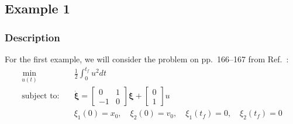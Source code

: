 \subsection{Example 1} \label{sec:ch5:example1}

\subsubsection{Description}

For the first example, we will consider the problem on pp.~166--167 from Ref.~\cite{Bryson1975a}:%
\begin{subequations}%
\begin{align}
\min_{u(t)} \quad & \frac{1}{2}\int_0^{t_f} u^2 dt \\
\text{subject to:} \quad & \dot{\bm{\xi}} = \begin{bmatrix} 0 & 1 \\ -1 & 0 \end{bmatrix} \bm{\xi} + \begin{bmatrix} 0 \\ 1 \end{bmatrix} u \\
& {\xi}_1(0) = x_0, \quad {\xi}_2(0) = v_0, \quad {\xi}_1(t_f) = 0, \quad {\xi}_2(t_f) = 0
\end{align} 
\end{subequations}%

